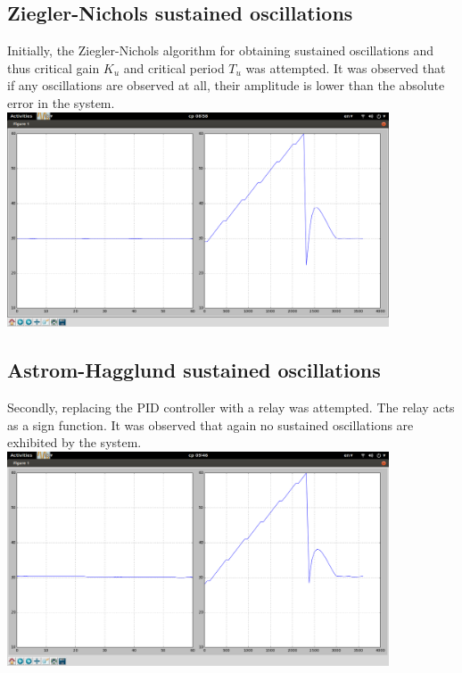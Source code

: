 \subsection{Ziegler-Nichols sustained oscillations}
Initially, the Ziegler-Nichols algorithm for obtaining sustained oscillations and thus critical gain $K_u$ and critical period $T_u$ was attempted.
It was observed that if any oscillations are observed at all, their amplitude is lower than the absolute error in the system.
\includegraphics[width=0.85\textwidth]{../images/exp_gain100}~

\subsection{Astrom-Hagglund sustained oscillations}
Secondly, replacing the PID controller with a relay was attempted.
The relay acts as a sign function.
It was observed that again no sustained oscillations are exhibited by the system.
\includegraphics[width=0.85\textwidth]{../images/exp_relay}~

